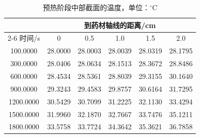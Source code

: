 \begin{table}[!htbp]\centering\small
\caption{预热阶段中部截面的温度，单位：$ {}^\circ\mathrm{C}$}\label{tab:q1-temperature}
\renewcommand{\arraystretch}{1.15}
\begin{tabular*}{0.96\textwidth}{@{\extracolsep{\fill}}cccccc}
\toprule
 & \multicolumn{5}{c}{到药材轴线的距离/cm}\\
\cmidrule(lr){2-6}
时间/s & 0 & 0.5 & 1.0 & 1.5 & 2.0\\\midrule
100.0000 & 28.0000 & 28.0003 & 28.0039 & 28.0319 & 28.1795\\
300.0000 & 28.0406 & 28.0634 & 28.1513 & 28.3672 & 28.8486\\
600.0000 & 28.4534 & 28.5361 & 28.8039 & 29.3155 & 30.1640\\
900.0000 & 29.3243 & 29.4583 & 29.8757 & 30.6164 & 31.7295\\
1200.0000 & 30.5429 & 30.7099 & 31.2225 & 32.1130 & 33.4294\\
1500.0000 & 31.9960 & 32.1870 & 32.7667 & 33.7476 & 35.1211\\
1800.0000 & 33.5758 & 33.7724 & 34.3642 & 35.3621 & 36.7858\\
\bottomrule
\end{tabular*}
\end{table}
